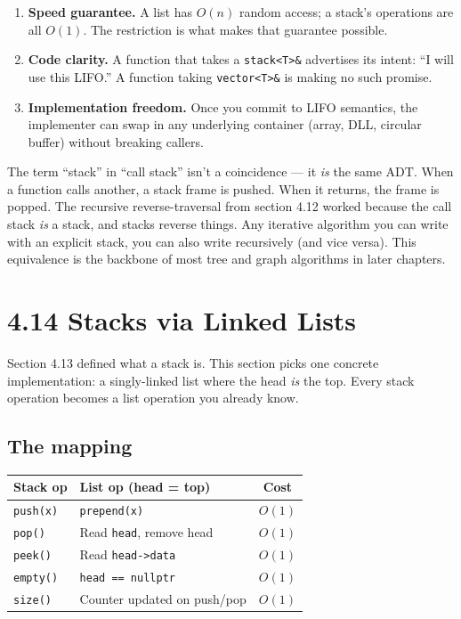 \documentclass[11pt]{article}
\begin{document}
\begin{enumerate}[leftmargin=*]
    \item \textbf{Speed guarantee.} A list has $O(n)$ random access;
          a stack's operations are all $O(1)$. The restriction is
          what makes that guarantee possible.
    \item \textbf{Code clarity.} A function that takes a
          \texttt{stack<T>\&} advertises its intent: ``I will use
          this LIFO.'' A function taking \texttt{vector<T>\&} is
          making no such promise.
    \item \textbf{Implementation freedom.} Once you commit to LIFO
          semantics, the implementer can swap in any underlying
          container (array, DLL, circular buffer) without
          breaking callers.
\end{enumerate}

\begin{notebox}
The term ``stack'' in ``call stack'' isn't a coincidence --- it
\emph{is} the same ADT. When a function calls another, a stack
frame is pushed. When it returns, the frame is popped. The
recursive reverse-traversal from section 4.12 worked because the
call stack \emph{is} a stack, and stacks reverse things. Any
iterative algorithm you can write with an explicit stack, you can
also write recursively (and vice versa). This equivalence is the
backbone of most tree and graph algorithms in later chapters.
\end{notebox}

\section{4.14 Stacks via Linked Lists}

Section 4.13 defined what a stack is. This section picks one
concrete implementation: a singly-linked list where the head
\emph{is} the top. Every stack operation becomes a list operation
you already know.

\subsection*{The mapping}

\begin{center}
\begin{tabular}{|l|l|c|}
\hline
\textbf{Stack op} & \textbf{List op (head = top)} & \textbf{Cost} \\
\hline
\texttt{push(x)}  & \texttt{prepend(x)}           & $O(1)$ \\
\texttt{pop()}    & Read \texttt{head}, remove head & $O(1)$ \\
\texttt{peek()}   & Read \texttt{head->data}      & $O(1)$ \\
\texttt{empty()}  & \texttt{head == nullptr}      & $O(1)$ \\
\texttt{size()}   & Counter updated on push/pop   & $O(1)$ \\
\hline
\end{tabular}
\end{center}
\end{document}
